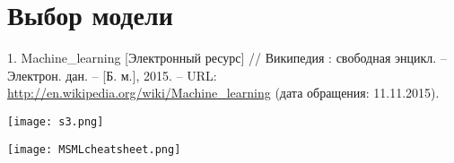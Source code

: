 \documentclass[pdf, intlimits, 9pt, unicode]{beamer}
\begin{document}
\section{Выбор модели}


\begin{frame}

1. Machine\_learning [Электронный ресурс] // Википедия : свободная энцикл. -- Электрон. дан. -- [Б. м.], 2015. -- URL: \url{http://en.wikipedia.org/wiki/Machine\_learning} (дата обращения: 11.11.2015).\\

\begin{center}\hspace{1cm}\texttt{[image: s3.png]}\end{center}
\end{frame}



\begin{frame}
\begin{center}\texttt{[image: MSMLcheatsheet.png]}\end{center}
\end{frame}





































\end{document}
